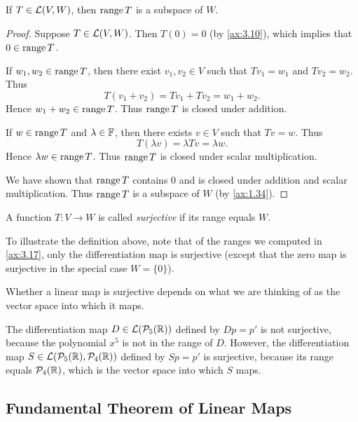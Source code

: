 \begin{result}\label{ax:3.18}
If $T\in\mathcal{L}(V,W)$, then $\operatorname{range} T$ is a subspace of $W$.
\end{result}

\begin{proof}
Suppose $T\in\mathcal{L}(V,W)$. Then $T(0)=0$ (by \ref{ax:3.10}), which implies that
$0\in\operatorname{range} T$.

If $w_1,w_2\in\operatorname{range} T$, then there exist $v_1,v_2\in V$ such that $Tv_1=w_1$
and $Tv_2=w_2$. Thus
\[ T(v_1+v_2)=Tv_1+Tv_2=w_1+w_2. \]
Hence $w_1+w_2\in\operatorname{range} T$. Thus $\operatorname{range} T$ is closed under addition.

If $w\in\operatorname{range} T$ and $\lambda\in\mathbb{F}$, then there exists $v\in V$ such that
$Tv=w$. Thus
\[ T(\lambda v)=\lambda Tv=\lambda w. \]
Hence $\lambda w\in\operatorname{range} T$. Thus $\operatorname{range} T$ is closed under scalar
multiplication.

We have shown that $\operatorname{range} T$ contains $0$ and is closed under addition and
scalar multiplication. Thus $\operatorname{range} T$ is a subspace of $W$ (by
\ref{ax:1.34}).
\end{proof}

\begin{definition}[Surjective]\label{ax:3.19}
A function $T\colon V\to W$ is called \emph{surjective} if its range equals
$W$.
\end{definition}

To illustrate the definition above, note that of the ranges we computed in
\ref{ax:3.17}, only the differentiation map is surjective (except that the
zero map is surjective in the special case $W=\{0\}$).

%
Whether a linear map is surjective depends on what we are thinking of as the
vector space into which it maps.

\begin{example}\label{ax:3.20}
The differentiation map $D\in\mathcal{L}(\mathcal{P}_5(\mathbb{R}))$ defined by $Dp=p'$ is not
surjective, because the polynomial $x^5$ is not in the range of $D$. However,
the differentiation map $S\in\mathcal{L}(\mathcal{P}_5(\mathbb{R}),\mathcal{P}_4(\mathbb{R}))$ defined by
$Sp=p'$ is surjective, because its range equals $\mathcal{P}_4(\mathbb{R})$, which is the
vector space into which $S$ maps.
\end{example}

\subsection{Fundamental Theorem of Linear Maps}

